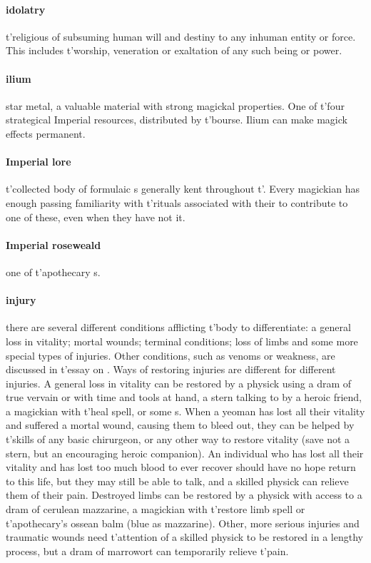 \paragraph{idolatry}t'religious  of subsuming human will and destiny to any inhuman entity or force. This includes t'\allowbreak worship, veneration or exaltation of any such being or power.
\paragraph{ilium} star metal, a valuable material with strong magickal properties. One of t'\allowbreak four strategical Imperial resources, distributed by t'\allowbreak bourse. Ilium can make magick effects permanent.
\paragraph{Imperial lore} t'\allowbreak collected body of formulaic s generally kent throughout t'\allowbreak {}. Every magickian has enough passing familiarity with t'\allowbreak rituals associated with their  to contribute to one of these, even when they have not  it.
\paragraph{Imperial roseweald} one of t'\allowbreak apothecary s.
\paragraph{injury} there are several different conditions afflicting t'\allowbreak body to differentiate: a general loss in vitality; mortal wounds; terminal conditions; loss of limbs and some more special types of injuries. Other conditions, such as venoms or weakness, are discussed in t'\allowbreak essay on . Ways of restoring injuries are different for different injuries. A general loss in vitality can be restored by a physick using a dram of true vervain or with time and tools at hand, a stern talking to by a heroic friend, a magickian with t'\allowbreak heal spell, or some s. When a yeoman has lost all their vitality and suffered a mortal wound, causing them to bleed out, they can be helped by t'\allowbreak skills of any basic chirurgeon, or any other way to restore vitality (save not a stern, but an encouraging heroic companion). An individual who has lost all their vitality and has lost too much blood to ever recover should have no hope return to this life, but they may still be able to talk, and a skilled physick can relieve them of their pain. Destroyed limbs can be restored by a physick with access to a dram of cerulean mazzarine, a magickian with t'\allowbreak restore limb spell or t'\allowbreak apothecary's ossean balm (blue as mazzarine). Other, more serious injuries and traumatic wounds need t'\allowbreak attention of a skilled physick to be restored in a lengthy process, but a dram of marrowort can temporarily relieve t'\allowbreak pain. 
